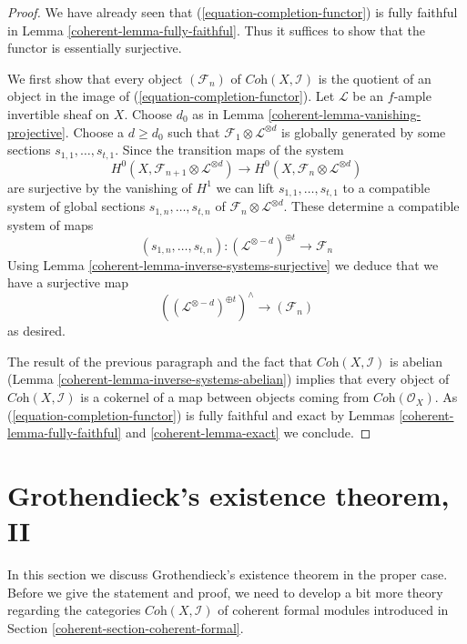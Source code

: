 \begin{proof}

We have already seen that (\ref{equation-completion-functor}) is
fully faithful in Lemma \ref{coherent-lemma-fully-faithful}. Thus it suffices
to show that the functor is essentially surjective.

\medskip\noindent
We first show that every object $(\mathcal{F}_n)$ of
$\textit{Coh}(X, \mathcal{I})$ is the quotient of an object
in the image of (\ref{equation-completion-functor}).
Let $\mathcal{L}$ be an $f$-ample invertible sheaf on $X$.
Choose $d_0$ as in Lemma \ref{coherent-lemma-vanishing-projective}.
Choose a $d \geq d_0$ such that
$\mathcal{F}_1 \otimes \mathcal{L}^{\otimes d}$
is globally generated by some sections $s_{1, 1}, \ldots, s_{t, 1}$.
Since the transition maps of the system
$$
H^0(X, \mathcal{F}_{n + 1} \otimes \mathcal{L}^{\otimes d})
\longrightarrow
H^0(X, \mathcal{F}_n \otimes \mathcal{L}^{\otimes d})
$$
are surjective by the vanishing of $H^1$ we can lift
$s_{1, 1}, \ldots, s_{t, 1}$ to a compatible system of global sections
$s_{1, n}, \ldots, s_{t, n}$ of
$\mathcal{F}_n \otimes \mathcal{L}^{\otimes d}$.
These determine a compatible system of maps
$$
(s_{1, n}, \ldots, s_{t, n}) :
(\mathcal{L}^{\otimes -d})^{\oplus t} \longrightarrow \mathcal{F}_n
$$
Using Lemma \ref{coherent-lemma-inverse-systems-surjective}
we deduce that we have a surjective map
$$
\left((\mathcal{L}^{\otimes -d})^{\oplus t}\right)^\wedge
\longrightarrow
(\mathcal{F}_n)
$$
as desired.

\medskip\noindent
The result of the previous paragraph and the fact that
$\textit{Coh}(X, \mathcal{I})$ is abelian
(Lemma \ref{coherent-lemma-inverse-systems-abelian})
implies that
every object of $\textit{Coh}(X, \mathcal{I})$ is a cokernel
of a map between objects coming from $\textit{Coh}(\mathcal{O}_X)$.
As (\ref{equation-completion-functor}) is fully faithful and exact by
Lemmas \ref{coherent-lemma-fully-faithful} and \ref{coherent-lemma-exact}
we conclude.
\end{proof}

\section{Grothendieck's existence theorem, II}
\label{coherent-section-existence-proper}
In this section we discuss Grothendieck's existence theorem in the proper case.
Before we give the statement and proof, we need to develop a bit
more theory regarding the categories $\textit{Coh}(X, \mathcal{I})$
of coherent formal modules
introduced in Section \ref{coherent-section-coherent-formal}.

